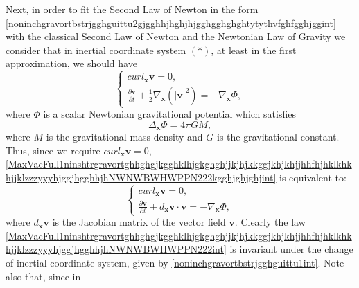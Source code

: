 \documentclass{article}
\theoremstyle{definition}
\theoremstyle{remark}
\renewcommand{\vec}[1]{\mathbf{#1}}
\newcommand{\er}{\eqref}
\newcommand{\er}{\eqref}
\begin{document}
Next, in order to fit the Second Law of Newton in the form
\er{noninchgravortbstrjgghguittu2gjgghhjhghjhjgghgghghghtytythvfghfgghjggint}
with the classical Second Law of Newton and the Newtonian Law of
Gravity we consider that in \underline{inertial} coordinate system
$(*)$, at least in the first approximation, we should have
\begin{equation}
\label{MaxVacFull1ninshtrgravortghhghgjkgghklhjgkghghjjkjhjkkggjkhjkhjjhhfhjhklkhkhjjklzzzyyyhjggjhgghhjhNWNWBWHWPPN222kgghjghjghjint}
\begin{cases}
curl_{\vec x}\vec v= 0,\\
\frac{\partial\vec v}{\partial t}+\frac{1}{2}\nabla_{\vec
x}\left(|\vec v|^2\right)= -\nabla_{\vec x}\Phi,
\end{cases}
\end{equation}
where $\Phi$ is a scalar Newtonian gravitational potential which
satisfies
\begin{equation}
\label{MaxVacFull1ninshtrgravortghhghgjkgghklhjgkghghjjkjhjkkggjkhjkhjjhhfhjhklkhkhjjklzzzyyyhjggjhgghhjhNWNWNWBWHWPPN222int}
\Delta_{\vec x}\Phi=4\pi GM,
\end{equation}
where $M$ is the gravitational mass density and $G$ is the
gravitational constant. Thus, since we require $curl_{\vec x}\vec v=
0$,
\er{MaxVacFull1ninshtrgravortghhghgjkgghklhjgkghghjjkjhjkkggjkhjkhjjhhfhjhklkhkhjjklzzzyyyhjggjhgghhjhNWNWBWHWPPN222kgghjghjghjint}
is equivalent to:
\begin{equation}
\label{MaxVacFull1ninshtrgravortghhghgjkgghklhjgkghghjjkjhjkkggjkhjkhjjhhfhjhklkhkhjjklzzzyyyhjggjhgghhjhNWNWBWHWPPN222int}
\begin{cases}
curl_{\vec x}\vec v= 0,\\
\frac{\partial\vec v}{\partial t}+d_\vec x\vec v\cdot\vec v=
-\nabla_{\vec x}\Phi,
\end{cases}
\end{equation}
where $d_{\vec x}\vec v$ is the Jacobian matrix of the vector field
$\vec v$. Clearly the law
\er{MaxVacFull1ninshtrgravortghhghgjkgghklhjgkghghjjkjhjkkggjkhjkhjjhhfhjhklkhkhjjklzzzyyyhjggjhgghhjhNWNWBWHWPPN222int}
is invariant under the change of inertial coordinate system, given
by \er{noninchgravortbstrjgghguittu1int}. Note also that, since in
\end{document}
